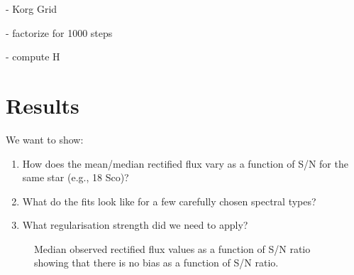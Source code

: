 \documentclass[modern]{aastex631}
\newcommand{\project}[1]{\textit{#1}}
\newcommand{\vectheta}{\boldsymbol{\theta}}
\newcommand{\vecalpha}{\boldsymbol{\alpha}}
\newcommand{\boss}{\project{BOSS}}
\begin{document}

- Korg Grid

- factorize for 1000 steps

- compute H



\section{Results}
\label{sec:results}

We want to show:
\begin{enumerate}
    \item How does the mean/median rectified flux vary as a function of S/N for the same star (e.g., 18 Sco)?
    \item What do the fits look like for a few carefully chosen spectral types?
    \item What regularisation strength did we need to apply?
\end{enumerate}


\begin{figure}
    \caption{Median observed rectified flux values as a function of S/N ratio showing that there is no bias as a function of S/N ratio.}
\end{figure}
\end{document}
